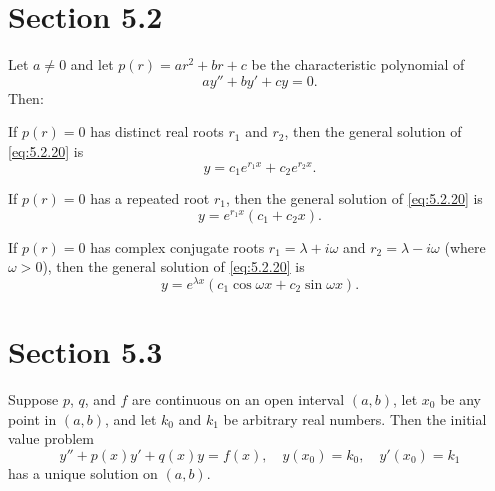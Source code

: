 \section*{Section 5.2}
\setcounter{chapter}{5}
\setcounter{section}{2}

\setcounter{theorem}{0}
\setcounter{equation}{19}
\begin{theorem}
  \label{thmtype:5.2.1} Let $a\ne0$ and let $p(r)=ar^{2}+br+c$ be the characteristic polynomial of
  \begin{equation}
    \label{eq:5.2.20}ay''+by'+cy=0.
  \end{equation}
  Then:
  \begin{alist}
    \item %
    If $p(r)=0$ has distinct real roots $r_{1}$ and $r_{2}$, then the general solution of
    \eqref{eq:5.2.20} is
    \[
      y=c_{1}e^{r_{1}x}+c_{2}e^{r_{2}x}.
    \]

    \item %
    If $p(r)=0$ has a repeated root $r_{1}$, then the general solution of \eqref{eq:5.2.20} is
    \[
      y=e^{r_{1}x}(c_{1}+c_{2}x).
    \]

    \item %
    If $p(r)=0$ has complex conjugate roots $r_{1}=\lambda+i\omega$ and $r_{2}=\lambda-i\omega$
    (where $\omega>0$), then the general solution of \eqref{eq:5.2.20} is
    \[
      y=e^{\lambda x}(c_{1}\cos\omega x+c_{2}\sin\omega x).
    \]
  \end{alist}
\end{theorem}

\section*{Section 5.3}
\setcounter{chapter}{5}
\setcounter{section}{3}

\setcounter{theorem}{0}
\begin{theorem}
  \label{thmtype:5.3.1} Suppose $p$, $q$, and $f$ are continuous on an open interval $(a,b)$, let
  $x_{0}$ be any point in $(a,b)$, and let $k_{0}$ and $k_{1}$ be arbitrary real numbers. Then the
  initial value problem
  \[
    y''+p(x)y'+q(x)y=f(x),\quad y(x_{0})=k_{0},\quad y'(x_{0})=k_{1}
  \]
  has a unique solution on $(a,b)$.
\end{theorem}


